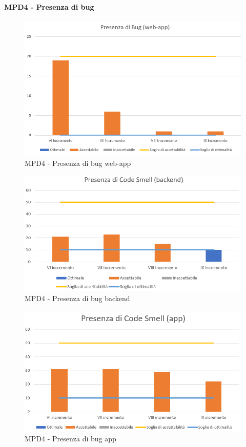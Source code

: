   \clearpage
  \paragraph{MPD4 - Presenza di bug}
  \begin{figure}[h!]
    \centering
      \includegraphics[scale=1]{Immagini/Bug WAA.PNG}
    \caption{MPD4 - Presenza di bug web-app}
  \end{figure}

  \begin{figure}[h!]
    \centering
      \includegraphics[scale=1]{Immagini/CodeSmell BEA.PNG}
    \caption{MPD4 - Presenza di bug backend}
  \end{figure}

  \begin{figure}[h!]
    \centering
      \includegraphics[scale=1]{Immagini/CodeSmell APPA.PNG}
    \caption{MPD4 - Presenza di bug app}
  \end{figure}

